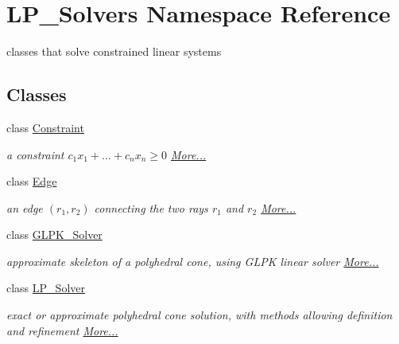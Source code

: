 \hypertarget{namespace_l_p___solvers}{}\section{L\+P\+\_\+\+Solvers Namespace Reference}
\label{namespace_l_p___solvers}


classes that solve constrained linear systems  


\subsection*{Classes}
\begin{DoxyCompactItemize}
\item 
class \hyperlink{group___c_l_s_solvers_class_l_p___solvers_1_1_constraint}{Constraint}
\begin{DoxyCompactList}\small\item\em a constraint $ c_1 x_1 + \ldots + c_n x_n \geq 0 $  \hyperlink{group___c_l_s_solvers_class_l_p___solvers_1_1_constraint}{More...}\end{DoxyCompactList}\item 
class \hyperlink{group___c_l_s_solvers_class_l_p___solvers_1_1_edge}{Edge}
\begin{DoxyCompactList}\small\item\em an edge $(r_1,r_2)$ connecting the two rays $ r_1 $ and $ r_2 $  \hyperlink{group___c_l_s_solvers_class_l_p___solvers_1_1_edge}{More...}\end{DoxyCompactList}\item 
class \hyperlink{group___c_l_s_solvers_class_l_p___solvers_1_1_g_l_p_k___solver}{G\+L\+P\+K\+\_\+\+Solver}
\begin{DoxyCompactList}\small\item\em approximate skeleton of a polyhedral cone, using G\+L\+PK linear solver  \hyperlink{group___c_l_s_solvers_class_l_p___solvers_1_1_g_l_p_k___solver}{More...}\end{DoxyCompactList}\item 
class \hyperlink{group___c_l_s_solvers_class_l_p___solvers_1_1_l_p___solver}{L\+P\+\_\+\+Solver}
\begin{DoxyCompactList}\small\item\em exact or approximate polyhedral cone solution, with methods allowing definition and refinement  \hyperlink{group___c_l_s_solvers_class_l_p___solvers_1_1_l_p___solver}{More...}\end{DoxyCompactList}\item 

\end{DoxyCompactItemize}

